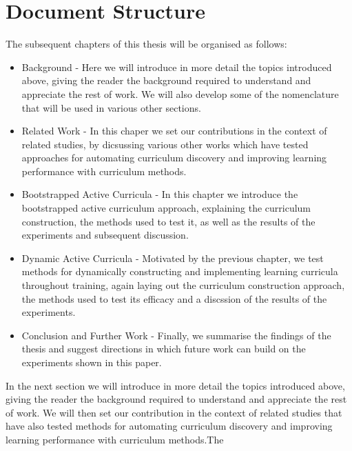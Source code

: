 \section{Document Structure}
The subsequent chapters of this thesis will be organised as follows:
\begin{itemize}
\item Background - Here we will introduce in more detail the topics introduced above, giving the reader the background required to understand and appreciate the rest of work. We will also develop some of the nomenclature that will be used in various other sections.
\item Related Work - In this chaper we set our contributions in the context of related studies, by dicsussing various other works which have tested approaches for automating curriculum discovery and improving learning performance with curriculum methods.
\item Bootstrapped Active Curricula - In this chapter we introduce the bootstrapped active curriculum approach, explaining the curriculum construction, the methods used to test it, as well as the results of the experiments and subsequent discussion.
\item Dynamic Active Curricula - Motivated by the previous chapter, we test methods for dynamically constructing and implementing learning curricula throughout training, again laying out the curriculum construction approach, the methods used to test its efficacy and a discssion of the results of the experiments.
\item Conclusion and Further Work - Finally, we summarise the findings of the thesis and suggest directions in which future work can build on the experiments shown in this paper.
\end{itemize}
In the next section we will introduce in more detail the topics introduced above, giving the reader the background required to understand and appreciate the rest of work. We will then set our contribution in the context of related studies that have also tested methods for automating curriculum discovery and improving learning performance with curriculum methods.The


